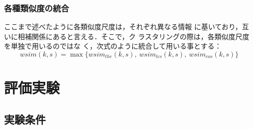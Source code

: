 \documentclass[japanese]{jnlp_1.4}
\begin{document}
\subsubsection{各種類似度の統合}

ここまで述べたように各類似度尺度は，それぞれ異なる情報
に基いており，互いに相補関係にあると言える．そこで，ク
ラスタリングの際は，各類似度尺度を単独で用いるのではな
く，次式のように統合して用いる事とする：
\begin{equation}
\mathit{wsim}(k, s) = \max \{\mathit{wsim}_\mathit{the}(k, s),\ \mathit{wsim}_\mathit{lcs}(k, s),\ \mathit{wsim}_\mathit{cos}(k, s)\}
\label{eq:sim_mix}
\end{equation}


\section{評価実験}
\label{sec:experiment}

\subsection{実験条件}
\end{document}
